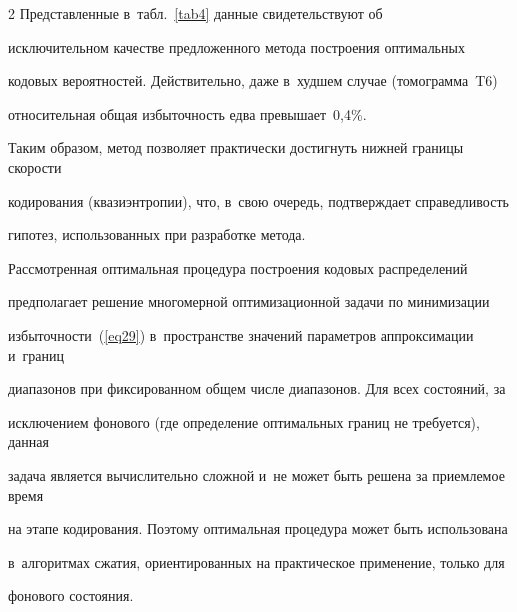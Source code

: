 \begin{multicols}{2}
Представленные в~табл.~\ref{tab4} данные свидетельствуют об 

исключительном качестве предложенного метода построения оптимальных 

кодовых вероятностей. Действительно, даже в~худшем случае (томограмма~T6) 

относительная общая избыточность едва превышает~0,4\%. 

Таким образом, метод позволяет практически достигнуть нижней границы ско\-рости 

кодирования (квазиэнтропии), что, в~свою очередь, подтверждает справедливость 

гипотез, использованных при разработке метода.



Рассмотренная оптимальная процедура построения кодовых распределений 

предполагает решение многомерной оптимизационной задачи по минимизации 

избыточности~(\ref{eq29}) в~пространстве значе\-ний параметров аппроксимации и~границ 

диапазонов при фиксированном общем числе диапазонов. Для всех состояний, за 

исключением фонового (где определение оптимальных границ не требуется), данная 

задача является вычислительно сложной и~не может быть решена за приемлемое время 

на этапе кодирования. Поэтому оптимальная процедура может быть использована 

в~алгоритмах сжатия, ориентированных на практическое применение, только для 

фонового состояния.




\begin{table}[b]\small 

\vspace*{-12pt}

\begin{center}


\label{tab5}

\vspace{2ex}



\tabcolsep=10pt

\begin{tabular}{|c|c|c|c|c|c|c|}


\end{tabular}
\end{center}
\end{table}
\end{multicols}
